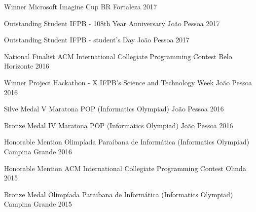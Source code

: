 \begin{cvhonors}

  \cvhonor
    {Winner}
    {Microsoft Imagine Cup BR}
    {Fortaleza}
    {2017} %

  \cvhonor
    {Outstanding Student}
    {IFPB - 108th Year Anniversary}
    {João Pessoa}
    {2017} %

  \cvhonor
    {Outstanding Student}
    {IFPB - student's Day}
    {João Pessoa}
    {2017} %

  \cvhonor
    {National Finalist}
    {ACM International Collegiate Programming Contest}
    {Belo Horizonte}
    {2016} %

  \cvhonor
    {Winner Project}
    {Hackathon - X IFPB's Science and Technology Week}
    {João Pessoa}
    {2016} %

  \cvhonor
    {Silve Medal}
    {V Maratona POP (Informatics Olympiad)}
    {João Pessoa}
    {2016} %

  \cvhonor
    {Bronze Medal}
    {IV Maratona POP (Informatics Olympiad)}
    {João Pessoa}
    {2016} %

  \cvhonor
    {Honorable Mention}
    {Olimpíada Paraibana de Informática (Informatics Olympiad)}
    {Campina Grande}
    {2016} %
%

  \cvhonor
    {Honorable Mention}
    {ACM International Collegiate Programming Contest}
    {Olinda}
    {2015} %

  \cvhonor
    {Bronze Medal}
    {Olimpíada Paraibana de Informática (Informatics Olympiad)}
    {Campina Grande}
    {2015} %
%


\end{cvhonors}
